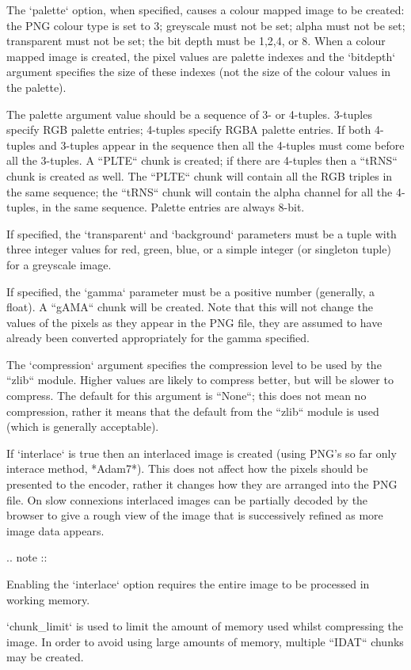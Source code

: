 \begin{DoxyVerb}
The `palette` option, when specified, causes a colour mapped image
to be created: the PNG colour type is set to 3; greyscale
must not be set; alpha must not be set; transparent must
not be set; the bit depth must be 1,2,4, or 8.  When a colour
mapped image is created, the pixel values are palette indexes
and the `bitdepth` argument specifies the size of these indexes
(not the size of the colour values in the palette).

The palette argument value should be a sequence of 3- or
4-tuples.  3-tuples specify RGB palette entries; 4-tuples
specify RGBA palette entries.  If both 4-tuples and 3-tuples
appear in the sequence then all the 4-tuples must come
before all the 3-tuples.  A ``PLTE`` chunk is created; if there
are 4-tuples then a ``tRNS`` chunk is created as well.  The
``PLTE`` chunk will contain all the RGB triples in the same
sequence; the ``tRNS`` chunk will contain the alpha channel for
all the 4-tuples, in the same sequence.  Palette entries
are always 8-bit.

If specified, the `transparent` and `background` parameters must
be a tuple with three integer values for red, green, blue, or
a simple integer (or singleton tuple) for a greyscale image.

If specified, the `gamma` parameter must be a positive number
(generally, a float).  A ``gAMA`` chunk will be created.  Note that
this will not change the values of the pixels as they appear in
the PNG file, they are assumed to have already been converted
appropriately for the gamma specified.

The `compression` argument specifies the compression level
to be used by the ``zlib`` module.  Higher values are likely
to compress better, but will be slower to compress.  The
default for this argument is ``None``; this does not mean
no compression, rather it means that the default from the
``zlib`` module is used (which is generally acceptable).

If `interlace` is true then an interlaced image is created
(using PNG's so far only interace method, *Adam7*).  This does not
affect how the pixels should be presented to the encoder, rather
it changes how they are arranged into the PNG file.  On slow
connexions interlaced images can be partially decoded by the
browser to give a rough view of the image that is successively
refined as more image data appears.

.. note ::

  Enabling the `interlace` option requires the entire image
  to be processed in working memory.

`chunk_limit` is used to limit the amount of memory used whilst
compressing the image.  In order to avoid using large amounts of
memory, multiple ``IDAT`` chunks may be created.
\end{DoxyVerb}
 

